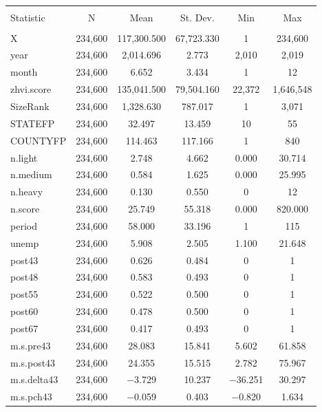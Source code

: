 \documentclass[12pt]{article}
\begin{document}
\begin{table}[!htbp] \centering 
  \caption{} 
  \label{} 
\begin{tabular}{@{\extracolsep{5pt}}lccccc} 
\\[-1.8ex]\hline 
\hline \\[-1.8ex] 
Statistic & \multicolumn{1}{c}{N} & \multicolumn{1}{c}{Mean} & \multicolumn{1}{c}{St. Dev.} & \multicolumn{1}{c}{Min} & \multicolumn{1}{c}{Max} \\ 
\hline \\[-1.8ex] 
X & 234,600 & 117,300.500 & 67,723.330 & 1 & 234,600 \\ 
year & 234,600 & 2,014.696 & 2.773 & 2,010 & 2,019 \\ 
month & 234,600 & 6.652 & 3.434 & 1 & 12 \\ 
zhvi.score & 234,600 & 135,041.500 & 79,504.160 & 22,372 & 1,646,548 \\ 
SizeRank & 234,600 & 1,328.630 & 787.017 & 1 & 3,071 \\ 
STATEFP & 234,600 & 32.497 & 13.459 & 10 & 55 \\ 
COUNTYFP & 234,600 & 114.463 & 117.166 & 1 & 840 \\ 
n.light & 234,600 & 2.748 & 4.662 & 0.000 & 30.714 \\ 
n.medium & 234,600 & 0.584 & 1.625 & 0.000 & 25.995 \\ 
n.heavy & 234,600 & 0.130 & 0.550 & 0 & 12 \\ 
n.score & 234,600 & 25.749 & 55.318 & 0.000 & 820.000 \\ 
period & 234,600 & 58.000 & 33.196 & 1 & 115 \\ 
unemp & 234,600 & 5.908 & 2.505 & 1.100 & 21.648 \\ 
post43 & 234,600 & 0.626 & 0.484 & 0 & 1 \\ 
post48 & 234,600 & 0.583 & 0.493 & 0 & 1 \\ 
post55 & 234,600 & 0.522 & 0.500 & 0 & 1 \\ 
post60 & 234,600 & 0.478 & 0.500 & 0 & 1 \\ 
post67 & 234,600 & 0.417 & 0.493 & 0 & 1 \\ 
m.s.pre43 & 234,600 & 28.083 & 15.841 & 5.602 & 61.858 \\ 
m.s.post43 & 234,600 & 24.355 & 15.515 & 2.782 & 75.967 \\ 
m.s.delta43 & 234,600 & $-$3.729 & 10.237 & $-$36.251 & 30.297 \\ 
m.s.pch43 & 234,600 & $-$0.059 & 0.403 & $-$0.820 & 1.634 \\ 

\end{tabular}
\end{table}
\end{document}
